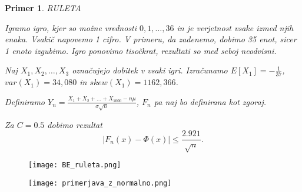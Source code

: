 \documentclass[12pt]{article}
\newtheorem{example}{Primer}
\begin{document}
\begin{example}{RULETA}

Igramo igro, kjer so možne vrednosti $0,1,\dots, 36$ in je verjetnost vsake izmed njih enaka. Vsakič napovemo 1 cifro. V primeru, da zadenemo, dobimo 35 enot, sicer 1 enoto izgubimo. Igro ponovimo tisočkrat, rezultati so med seboj neodvisni. 

\vspace{3mm}
\noindent
Naj $X_1, X_2, \dots , X_3$  označujejo dobitek v vsaki igri. Izračunamo $E[X_1] = - \frac{1}{37}$, ${var(X_1) = 34,080}$ in $skew(X_1) = 1162,366$.

\vspace{3mm}\noindent
Definiramo  $Y_n = \frac{X_1 +X_2 +\dots +X_{1000} - n\mu}{\sigma \sqrt{n}}$, $F_n$ pa naj bo definirana kot zgoraj.

Za $C= 0.5$ dobimo rezultat  
$$|F_n(x) - \Phi(x)| \leq \frac{2.921}{\sqrt{n}}.$$

\end{example}

\begin{figure}[H]
    \centering
    \texttt{[image: BE\_ruleta.png]}
\end{figure}

\begin{figure}[H]
    \centering
    \texttt{[image: primerjava\_z\_normalno.png]}
\end{figure}
\end{document}
